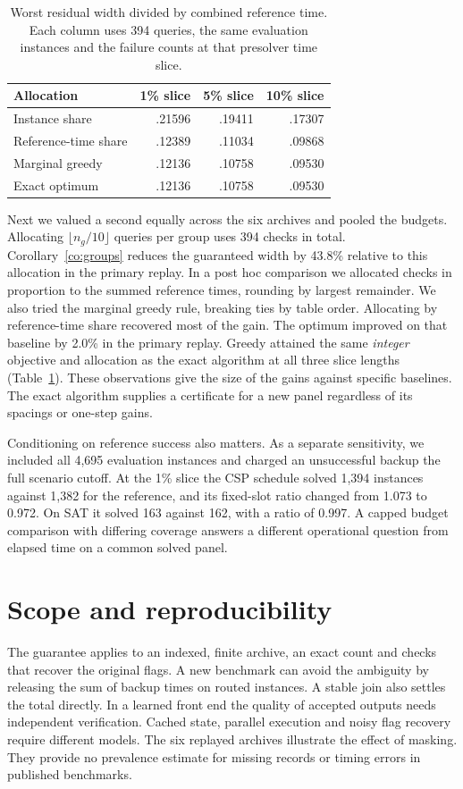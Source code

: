 \documentclass[final,5p,times,twocolumn]{elsarticle}
\begin{document}
\begin{table}[t]
\centering\footnotesize
\caption{Worst residual width divided by combined reference time. Each column uses 394 queries, the same evaluation instances and the failure counts at that presolver time slice.}
\label{tab:allocation}
\begin{tabular}{lrrr}\toprule
Allocation & 1\% slice & 5\% slice & 10\% slice\\\midrule
Instance share & .21596 & .19411 & .17307\\
Reference-time share & .12389 & .11034 & .09868\\
Marginal greedy & .12136 & .10758 & .09530\\
Exact optimum & .12136 & .10758 & .09530\\\bottomrule
\end{tabular}
\end{table}

Next we valued a second equally across the six archives and pooled the budgets. Allocating $\lfloor n_g/10\rfloor$ queries per group uses 394 checks in total. Corollary~\ref{co:groups} reduces the guaranteed width by 43.8\% relative to this allocation in the primary replay. In a post hoc comparison we allocated checks in proportion to the summed reference times, rounding by largest remainder. We also tried the marginal greedy rule, breaking ties by table order. Allocating by reference-time share recovered most of the gain. The optimum improved on that baseline by 2.0\% in the primary replay. Greedy attained the same \emph{integer} objective and allocation as the exact algorithm at all three slice lengths (Table~\ref{tab:allocation}). These observations give the size of the gains against specific baselines. The exact algorithm supplies a certificate for a new panel regardless of its spacings or one-step gains.

Conditioning on reference success also matters. As a separate sensitivity, we included all 4,695 evaluation instances and charged an unsuccessful backup the full scenario cutoff. At the 1\% slice the CSP schedule solved 1,394 instances against 1,382 for the reference, and its fixed-slot ratio changed from 1.073 to 0.972. On SAT it solved 163 against 162, with a ratio of 0.997. A capped budget comparison with differing coverage answers a different operational question from elapsed time on a common solved panel.

\section{Scope and reproducibility}
The guarantee applies to an indexed, finite archive, an exact count and checks that recover the original flags. A new benchmark can avoid the ambiguity by releasing the sum of backup times on routed instances. A stable join also settles the total directly. In a learned front end the quality of accepted outputs needs independent verification. Cached state, parallel execution and noisy flag recovery require different models. The six replayed archives illustrate the effect of masking. They provide no prevalence estimate for missing records or timing errors in published benchmarks.
\end{document}
